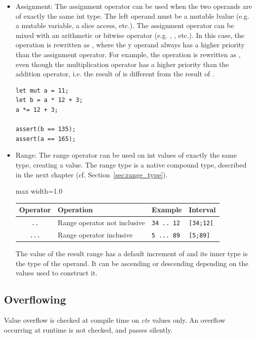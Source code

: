 \begin{itemize}
\item Assignment: The assignment operator \token{=} can be used when the two
  operands are of exactly the same int type. The left operand must be a mutable
  lvalue (e.g. a mutable variable, a slice access, etc.). The assignment
  operator can be mixed with an arithmetic or bitwise operator (e.g. \token{+=},
  \token{\&=}, etc.). In this case, the operation  is rewritten
  as , where the y operand always has a higher priority than
  the assignment operator. For example, the operation  is
  rewritten as , even though the multiplication
  operator has a higher priority than the addition operator, i.e. the result of
   is different from the result of .

  \begin{lstlisting}[style=coloredverbatim]
let mut a = 11;
let b = a * 12 + 3;
a *= 12 + 3;

assert(b == 135);
assert(a == 165);
  \end{lstlisting}

\item Range: The range operator can be used on int values of exactly the same
  type, creating a  value. The range type is a native compound
  type, described in the next chapter (cf. Section~\ref{sec:range_type}).

  \begin{center}
    \begin{adjustbox}{max width=1.0\linewidth}
      \begin{tabular}{|c|lll|}
        \hline
        Operator & Operation & Example & Interval\\[0pt]
        \hline
        \texttt{..} & Range operator not inclusive & \texttt{34 .. 12} & \texttt{[34;12[}\\[0pt]
            \texttt{...} & Range operator inclusive & \texttt{5 ... 89} & \texttt{[5;89]}\\[0pt]
            \hline
      \end{tabular}
    \end{adjustbox}
  \end{center}

The value of the result range has a default increment of  and its
inner type is the type of the operand. It can be ascending or descending
depending on the values used to construct it.

\end{itemize}

\subsection{Overflowing}
\label{sec:org0881da2}

Value overflow is checked at compile time on \textit{cte} values only. An
overflow occurring at runtime is not checked, and passes silently.

\vfill%
\pagebreak




